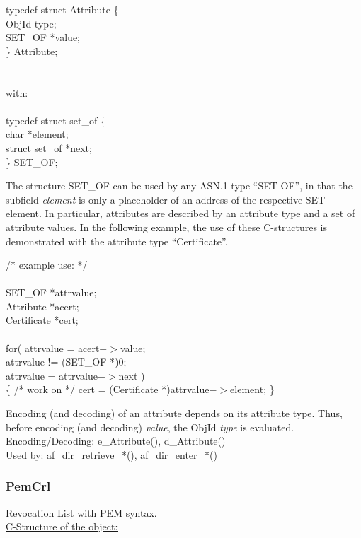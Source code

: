{\small
\btab
\1      typedef struct Attribute \{ \\
\2              ObjId \2   type; \\
\2              SET\_OF \2      *value; \\
\1       \} Attribute; \\ \\ \\
with:   \\ \\
\1      typedef struct set\_of \{ \\
\2              char  \2          *element; \\
\2              struct set\_of \2 *next; \\
\1      \} SET\_OF; \\
\etab
}

The structure SET\_OF can be used by any ASN.1 type ``SET OF'',
in that the subfield {\em *element} is only a placeholder
of an address of the respective SET element.
In particular, attributes are described by an attribute type
and a set of attribute values. In the following example,
the use of these C-structures is demonstrated with
the attribute type ``Certificate''.

{\small
\btab
\1 /* example use: */   \\ \\
\2      SET\_OF     \2   *attrvalue; \\
\2      Attribute   \2   *acert;     \\
\2      Certificate \2   *cert;      \\ \\
\2      for( attrvalue = acert$->$value;  \\
\3         attrvalue != (SET\_OF *)0;  \\
\3         attrvalue = attrvalue$->$next ) \\
\2         \{ /* work on */ cert = (Certificate *)attrvalue$->$element; \} \\
\etab
}

Encoding (and decoding) of an attribute depends on its attribute type.
Thus, before encoding (and decoding) {\em value},
the ObjId {\em type} is evaluated.
\\
Encoding/Decoding: e\_Attribute(), d\_Attribute() \\
Used by: af\_dir\_retrieve\_*(), af\_dir\_enter\_*()

\subsubsection{PemCrl}
Revocation List with PEM syntax. \\
\underline{C-Structure of the object:}

